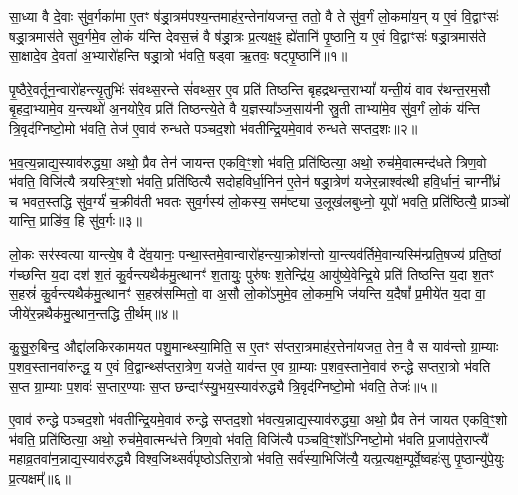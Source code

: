 
{\anuvakamend[{}]}


\setcounter{anuvakam}{0}
सा॒ध्या वै दे॒वाः सु॑व॒र्गका॑मा ए॒तꣳ ष॑ड्रा॒त्रम॑पश्य॒न्तमाह॑र॒न्तेना॑यजन्त॒ ततो॒ वै ते सु॑व॒र्गं लो॒कमा॑य॒न् य ए॒वं वि॒द्वाꣳसः॑ षड्रा॒त्रमास॑ते सुव॒र्गमे॒व लो॒कं य॑न्ति देवस॒त्त्रं वै ष॑ड्रा॒त्रः प्र॒त्यक्ष॒ꣴ॒ ह्ये॑तानि॑ पृ॒ष्ठानि॒ य ए॒वं वि॒द्वाꣳसः॑ षड्रा॒त्रमास॑ते सा॒क्षादे॒व दे॒वता॑ अ॒भ्यारो॑हन्ति षड्रा॒त्रो भ॑वति॒ षड्वा ऋ॒तवः॒ षट्पृ॒ष्ठानि॑॥१॥

पृ॒ष्ठैरे॒वर्तून॒न्वारो॑हन्त्यृ॒तुभिः॑ संवथ्स॒रन्ते सं॑वथ्स॒र ए॒व प्रति॑ तिष्ठन्ति बृहद्रथन्त॒रा\-भ्यां᳚ यन्ती॒यं वाव र॑थन्त॒रम॒सौ बृ॒हदा॒भ्यामे॒व य॒न्त्यथो॑ अ॒नयो॑रे॒व प्रति॑ तिष्ठन्त्ये॒ते वै य॒ज्ञस्या᳚ञ्ज॒साय॑नी स्रु॒ती ताभ्या॑मे॒व सु॑व॒र्गं लो॒कं य॑न्ति त्रि॒वृद॑ग्निष्टो॒मो भ॑वति॒ तेज॑ ए॒वाव॑ रुन्धते पञ्चद॒शो भ॑वतीन्द्रि॒यमे॒वाव॑ रुन्धते सप्तद॒शः॥२॥

भ॒व॒त्य॒न्नाद्य॒स्याव॑रुद्ध्या॒ अथो॒ प्रैव तेन॑ जायन्त एकवि॒ꣳ॒शो भ॑वति॒ प्रति॑ष्ठित्या॒ अथो॒ रुच॑मे॒वात्मन्द॑धते त्रिण॒वो भ॑वति॒ विजि॑त्यै त्रयस्त्रि॒ꣳ॒शो भ॑वति॒ प्रति॑ष्ठित्यै सदोहविर्धा॒निन॑ ए॒तेन॑ षड्रा॒त्रेण॑ यजेर॒न्नाश्व॑त्थी हवि॒र्धानं॒ चाग्नी᳚ध्रं च भवत॒स्तद्धि सु॑व॒र्ग्यं॑ च॒क्रीव॑ती भवतः सुव॒र्गस्य॑ लो॒कस्य॒ सम॑ष्ट्या उ॒लूख॑लबुध्नो॒ यूपो॑ भवति॒ प्रति॑ष्ठित्यै॒ प्राञ्चो॑ यान्ति॒ प्राङि॑व॒ हि सु॑व॒र्गः॥३॥

लो॒कः सर॑स्वत्या यान्त्ये॒ष वै दे॑व॒यानः॒ पन्था॒स्तमे॒वान्वारो॑हन्त्या॒क्रोश॑न्तो या॒न्त्यव॑र्तिमे॒वान्यस्मि॑न्प्रति॒षज्य॑ प्रति॒ष्ठां ग॑च्छन्ति य॒दा दश॑ श॒तं कु॒र्वन्त्यथैक॑मु॒त्थानꣳ॑ श॒तायुः॒ पुरु॑षः श॒तेन्द्रि॑य॒ आयु॑ष्ये॒वेन्द्रि॒ये प्रति॑ तिष्ठन्ति य॒दा श॒तꣳ स॒हस्रं॑ कु॒र्वन्त्यथैक॑मु॒त्थानꣳ॑ स॒हस्र॑सम्मितो॒ वा अ॒सौ लो॒को॑\-ऽमुमे॒व लो॒कम॒भि ज॑यन्ति य॒दैषां᳚ प्र॒मीये॑त य॒दा वा॒ जीये॑र॒न्नथैक॑मु॒त्थान॒न्तद्धि ती॒र्थम्॥४॥

{\anuvakamend[{पृ॒ष्ठानि॑ सप्तद॒शः सु॑व॒र्गो ज॑यन्ति य॒दैका॑दश च॥१॥}]}

कु॒सु॒रु॒बिन्द॒ औद्दा॑लकिरकामयत पशु॒मान्थ्स्या॒मिति॒ स ए॒तꣳ स॑प्तरा॒त्रमाह॑र॒त्तेना॑यजत॒ तेन॒ वै स याव॑न्तो ग्रा॒म्याः प॒शव॒स्तानवा॑रुन्द्ध॒ य ए॒वं वि॒द्वान्थ्स॑प्तरा॒त्रेण॒ यज॑ते॒ याव॑न्त ए॒व ग्रा॒म्याः प॒शव॒स्ताने॒वाव॑ रुन्द्धे सप्तरा॒त्रो भ॑वति स॒प्त ग्रा॒म्याः प॒शवः॑ स॒प्तार॒ण्याः स॒प्त छन्दाꣳ॑स्यु॒भय॒स्याव॑रुद्ध्यै त्रि॒वृद॑ग्निष्टो॒मो भ॑वति॒ तेजः॑॥५॥

ए॒वाव॑ रुन्द्धे पञ्चद॒शो भ॑वतीन्द्रि॒यमे॒वाव॑ रुन्द्धे सप्तद॒शो भ॑वत्य॒न्नाद्य॒स्याव॑रुद्ध्या॒ अथो॒ प्रैव तेन॑ जायत एकवि॒ꣳ॒शो भ॑वति॒ प्रति॑ष्ठित्या॒ अथो॒ रुच॑मे॒वात्मन्ध॑त्ते त्रिण॒वो भ॑वति॒ विजि॑त्यै पञ्चवि॒ꣳ॒शो᳚\-ऽग्निष्टो॒मो भ॑वति प्र॒जाप॑ते॒राप्त्यै॑ महाव्र॒तवा॑न॒न्नाद्य॒स्याव॑रुद्ध्यै विश्व॒जिथ्सर्व॑पृष्ठो\-ऽतिरा॒त्रो भ॑वति॒ सर्व॑स्या॒भिजि॑त्यै॒ यत्प्र॒त्यक्ष॒म्पूर्वे॒ष्वहः॑सु पृ॒ष्ठान्यु॑पे॒युः प्र॒त्यक्षम्᳚॥६॥


